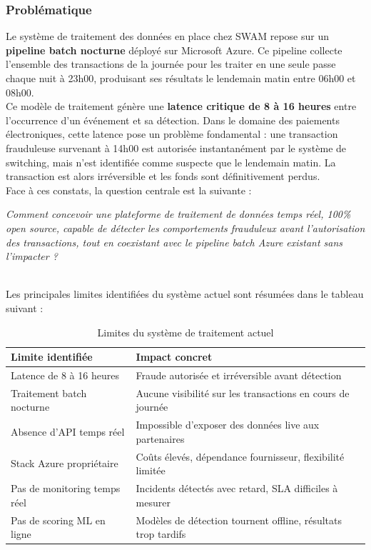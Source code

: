 \subsubsection{Problématique}
\vspace{0.3cm}
Le système de traitement des données en place chez SWAM repose sur un \textbf{pipeline batch nocturne} déployé sur Microsoft Azure. Ce pipeline collecte l'ensemble des transactions de la journée pour les traiter en une seule passe chaque nuit à 23h00, produisant ses résultats le lendemain matin entre 06h00 et 08h00.
\\[0.3cm]
Ce modèle de traitement génère une \textbf{latence critique de 8 à 16 heures} entre l'occurrence d'un événement et sa détection. Dans le domaine des paiements électroniques, cette latence pose un problème fondamental : une transaction frauduleuse survenant à 14h00 est autorisée instantanément par le système de switching, mais n'est identifiée comme suspecte que le lendemain matin. La transaction est alors irréversible et les fonds sont définitivement perdus.
\\[0.3cm]
Face à ces constats, la question centrale est la suivante :
\\[0.2cm]
\begin{center}
\textit{Comment concevoir une plateforme de traitement de données temps réel, 100\% open source, capable de détecter les comportements frauduleux avant l'autorisation des transactions, tout en coexistant avec le pipeline batch Azure existant sans l'impacter ?}
\end{center}
\\[0.3cm]
Les principales limites identifiées du système actuel sont résumées dans le tableau suivant :

\vspace{0.3cm}
\renewcommand{\arraystretch}{1.3}
\begin{table}[h!]
\centering
\begin{tabularx}{\textwidth}{@{} l X @{}}
\toprule
\textbf{Limite identifiée} & \textbf{Impact concret} \\
\midrule
Latence de 8 à 16 heures & Fraude autorisée et irréversible avant détection \\
\rowcolor{gray!6}
Traitement batch nocturne & Aucune visibilité sur les transactions en cours de journée \\
Absence d'API temps réel & Impossible d'exposer des données live aux partenaires \\
\rowcolor{gray!6}
Stack Azure propriétaire & Coûts élevés, dépendance fournisseur, flexibilité limitée \\
Pas de monitoring temps réel & Incidents détectés avec retard, SLA difficiles à mesurer \\
\rowcolor{gray!6}
Pas de scoring ML en ligne & Modèles de détection tournent offline, résultats trop tardifs \\
\bottomrule
\end{tabularx}
\caption{Limites du système de traitement actuel}
\label{tab:limites}
\end{table}

